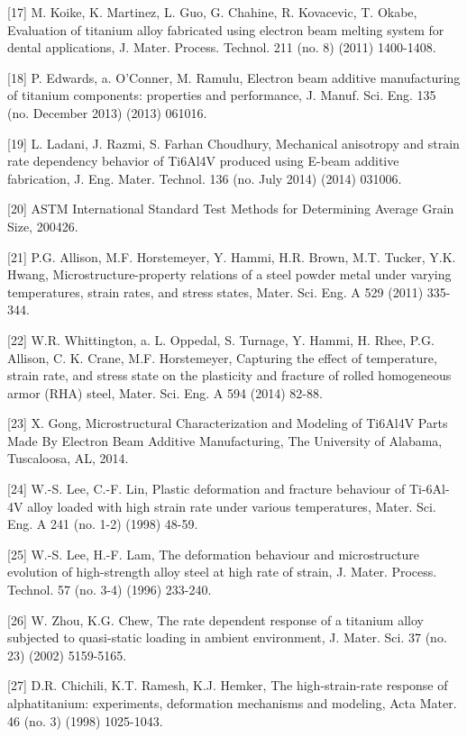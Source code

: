 \documentclass[10pt]{article}
\begin{document}
[17] M. Koike, K. Martinez, L. Guo, G. Chahine, R. Kovacevic, T. Okabe, Evaluation of titanium alloy fabricated using electron beam melting system for dental applications, J. Mater. Process. Technol. 211 (no. 8) (2011) 1400-1408.

[18] P. Edwards, a. O'Conner, M. Ramulu, Electron beam additive manufacturing of titanium components: properties and performance, J. Manuf. Sci. Eng. 135 (no. December 2013) (2013) 061016.

[19] L. Ladani, J. Razmi, S. Farhan Choudhury, Mechanical anisotropy and strain rate dependency behavior of Ti6Al4V produced using E-beam additive fabrication, J. Eng. Mater. Technol. 136 (no. July 2014) (2014) 031006.

[20] ASTM International Standard Test Methods for Determining Average Grain Size, 200426.

[21] P.G. Allison, M.F. Horstemeyer, Y. Hammi, H.R. Brown, M.T. Tucker, Y.K. Hwang, Microstructure-property relations of a steel powder metal under varying temperatures, strain rates, and stress states, Mater. Sci. Eng. A 529 (2011) 335-344.

[22] W.R. Whittington, a. L. Oppedal, S. Turnage, Y. Hammi, H. Rhee, P.G. Allison, C. K. Crane, M.F. Horstemeyer, Capturing the effect of temperature, strain rate, and stress state on the plasticity and fracture of rolled homogeneous armor (RHA) steel, Mater. Sci. Eng. A 594 (2014) 82-88.

[23] X. Gong, Microstructural Characterization and Modeling of Ti6Al4V Parts Made By Electron Beam Additive Manufacturing, The University of Alabama, Tuscaloosa, AL, 2014.

[24] W.-S. Lee, C.-F. Lin, Plastic deformation and fracture behaviour of Ti-6Al-4V alloy loaded with high strain rate under various temperatures, Mater. Sci. Eng. A 241 (no. 1-2) (1998) 48-59.

[25] W.-S. Lee, H.-F. Lam, The deformation behaviour and microstructure evolution of high-strength alloy steel at high rate of strain, J. Mater. Process. Technol. 57 (no. 3-4) (1996) 233-240.

[26] W. Zhou, K.G. Chew, The rate dependent response of a titanium alloy subjected to quasi-static loading in ambient environment, J. Mater. Sci. 37 (no. 23) (2002) 5159-5165.

[27] D.R. Chichili, K.T. Ramesh, K.J. Hemker, The high-strain-rate response of alphatitanium: experiments, deformation mechanisms and modeling, Acta Mater. 46 (no. 3) (1998) 1025-1043.
\end{document}
